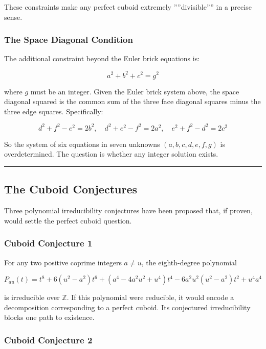 \documentclass[10pt,a4paper]{article}
\begin{document}
These constraints make any perfect cuboid extremely ''''divisible'''' in a precise sense.

\subsubsection{The Space Diagonal Condition}

The additional constraint beyond the Euler brick equations is:

\[a^2 + b^2 + c^2 = g^2\]

where $g$ must be an integer. Given the Euler brick system above, the space diagonal squared is the common sum of the three face diagonal squares minus the three edge squares. Specifically:

\[d^2 + f^2 - e^2 = 2b^2, \quad d^2 + e^2 - f^2 = 2a^2, \quad e^2 + f^2 - d^2 = 2c^2\]

So the system of six equations in seven unknowns $(a, b, c, d, e, f, g)$ is overdetermined. The question is whether any integer solution exists.

\begin{center}
\rule{0.5\textwidth}{0.4pt}
\end{center}

\subsection{The Cuboid Conjectures}

Three polynomial irreducibility conjectures have been proposed that, if proven, would settle the perfect cuboid question.

\subsubsection{Cuboid Conjecture 1}

For any two positive coprime integers $a \neq u$, the eighth-degree polynomial

\[P_{au}(t) = t^8 + 6(u^2 - a^2)t^6 + (a^4 - 4a^2u^2 + u^4)t^4 - 6a^2u^2(u^2 - a^2)t^2 + u^4a^4\]

is irreducible over $\mathbb{Z}$. If this polynomial were reducible, it would encode a decomposition corresponding to a perfect cuboid. Its conjectured irreducibility blocks one path to existence.

\subsubsection{Cuboid Conjecture 2}
\end{document}
